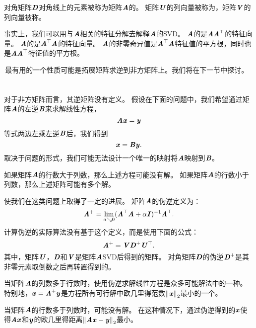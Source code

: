 对角矩阵$\MD$对角线上的元素被称为矩阵$\MA$的。
矩阵$\MU$的列向量被称为，矩阵$\MV$的列向量被称。


事实上，我们可以用与$\MA$相关的特征分解去解释$\MA$的\gls{SVD}。
$\MA$的是$\MA\MA^\top$的特征向量。
$\MA$的是$\MA^\top\MA$的特征向量。
$\MA$的非零奇异值是$\MA^\top\MA$特征值的平方根，同时也是$\MA\MA^\top$特征值的平方根。


\,最有用的一个性质可能是拓展矩阵求逆到非方矩阵上。我们将在下一节中探讨。




\section{}
\label{sec:the_moore_penrose_pseudoinverse}


对于非方矩阵而言，其逆矩阵没有定义。
假设在下面的问题中，我们希望通过矩阵$\MA$的左逆$\MB$来求解线性方程，
\begin{equation}
    \MA\Vx=\Vy
\end{equation}
等式两边左乘左逆$\MB$后，我们得到
\begin{equation}
    \Vx=\MB\Vy.
\end{equation}
取决于问题的形式，我们可能无法设计一个唯一的映射将$\MA$映射到$\MB$。


如果矩阵$\MA$的行数大于列数，那么上述方程可能没有解。
如果矩阵$\MA$的行数小于列数，那么上述矩阵可能有多个解。


使我们在这类问题上取得了一定的进展。
矩阵$\MA$的伪逆定义为：
\begin{equation}
    \MA^+ = \lim_{a \searrow 0} (\MA^\top\MA + \alpha \MI)^{-1} \MA^\top.
\end{equation}
计算伪逆的实际算法没有基于这个定义，而是使用下面的公式：
\begin{equation}
    \MA^+ = \MV\MD^+\MU^\top.
\end{equation}
其中，矩阵$\MU$，$\MD$和$\MV$是矩阵$\MA$\gls{SVD}后得到的矩阵。
对角矩阵$\MD$的伪逆$\MD^+$是其非零元素取倒数之后再转置得到的。


当矩阵$\MA$的列数多于行数时，使用伪逆求解线性方程是众多可能解法中的一种。
特别地，$\Vx=\MA^+\Vy$是方程所有可行解中欧几里得范数$\norm{\Vx}_2$最小的一个。


当矩阵$\MA$的行数多于列数时，可能没有解。
在这种情况下，通过伪逆得到的$\Vx$使得$\MA\Vx$和$\Vy$的欧几里得距离$\norm{\MA\Vx-\Vy}_2$最小。





